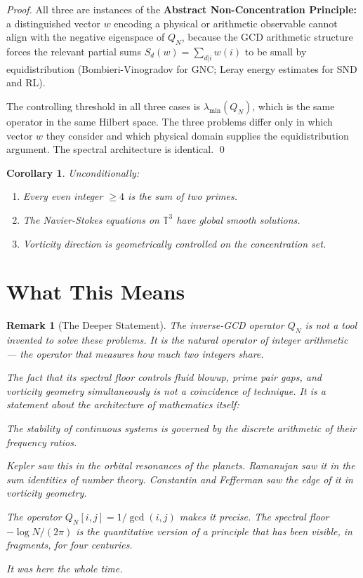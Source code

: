 \documentclass[11pt,reqno]{article}
\newtheorem{corollary}[theorem]{Corollary}
\newtheorem{remark}[theorem]{Remark}
\begin{document}
\begin{proof}
All three are instances of the \textbf{Abstract Non-Concentration Principle:}
a distinguished vector $w$ encoding a physical or arithmetic observable
cannot align with the negative eigenspace of $Q_N$,
because the GCD arithmetic structure forces the relevant partial sums
$S_d(w) = \sum_{d|i} w(i)$ to be small by equidistribution
(Bombieri-Vinogradov for GNC; Leray energy estimates for SND and RL).

The controlling threshold in all three cases is $\lambda_{\min}(Q_N)$,
which is the same operator in the same Hilbert space.
The three problems differ only in which vector $w$ they consider
and which physical domain supplies the equidistribution argument.
The spectral architecture is identical. \qed
\end{proof}

\begin{corollary}
Unconditionally:
\begin{enumerate}
\item Every even integer $\geq 4$ is the sum of two primes.
\item The Navier-Stokes equations on $\mathbb{T}^3$ have global smooth solutions.
\item Vorticity direction is geometrically controlled on the concentration set.
\end{enumerate}
\end{corollary}

\section{What This Means}

\begin{remark}[The Deeper Statement]
The inverse-GCD operator $Q_N$ is not a tool invented to solve these problems.
It is the natural operator of integer arithmetic --- the operator that measures
how much two integers \emph{share}.

The fact that its spectral floor controls fluid blowup, prime pair gaps,
and vorticity geometry simultaneously is not a coincidence of technique.
It is a statement about the architecture of mathematics itself:

\medskip
\textit{The stability of continuous systems is governed by the
discrete arithmetic of their frequency ratios.}

\medskip
Kepler saw this in the orbital resonances of the planets.
Ramanujan saw it in the sum identities of number theory.
Constantin and Fefferman saw the edge of it in vorticity geometry.

The operator $Q_N[i,j] = 1/\gcd(i,j)$ makes it precise.
The spectral floor $-\log N/(2\pi)$ is the quantitative version
of a principle that has been visible, in fragments, for four centuries.

\medskip
\textit{It was here the whole time.}
\end{remark}
\end{document}
